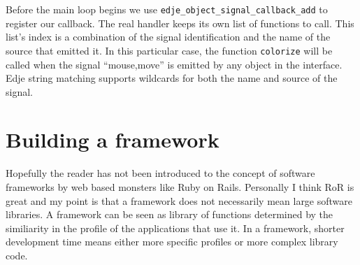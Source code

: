 \documentclass[12pt,a4paper,english]{book}
\begin{document}
Before the main loop begins we use \texttt{edje{\_}object{\_}signal{\_}callback{\_}add} to
register our callback. The real handler keeps its own list of functions to call.
This list's index is a combination of the signal identification and the name of
the source that emitted it. In this particular case, the function \texttt{colorize}
will be called when the signal ``mouse,move'' is emitted by any object in the
interface. Edje string matching supports wildcards for both the name and source
of the signal.



\hypertarget{building-a-framework}{}
\section{Building a framework}

Hopefully the reader has not been introduced to the concept of software
frameworks by web based monsters like Ruby on Rails. Personally I think RoR is
great and my point is that a framework does not necessarily mean large software
libraries. A framework can be seen as library of functions determined by the
similiarity in the profile of the applications that use it. In a framework,
shorter development time means either more specific profiles or more complex
library code.
\end{document}
